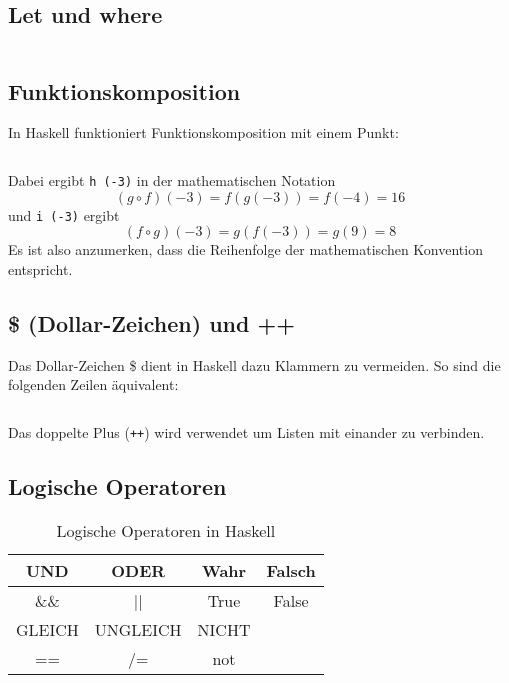 \subsection{Let und where}%
\inputminted[numbersep=5pt, tabsize=4]{haskell}{scripts/haskell/let-where-bindung.hs}

\subsection{Funktionskomposition}%
In Haskell funktioniert Funktionskomposition mit einem Punkt:

\inputminted[numbersep=5pt, tabsize=4]{haskell}{scripts/haskell/function-composition.hs}

Dabei ergibt \texttt{h (-3)} in der mathematischen Notation
\[(g \circ f) (-3) = f(g(-3)) = f(-4) = 16\]
und \texttt{i (-3)} ergibt
\[(f \circ g) (-3) = g(f(-3)) = g(9) = 8\]
Es ist also anzumerken, dass die Reihenfolge der mathematischen Konvention entspricht.

\subsection{\$ (Dollar-Zeichen) und ++}%
Das Dollar-Zeichen \$ dient in Haskell dazu Klammern zu vermeiden. So sind die
folgenden Zeilen äquivalent:

\inputminted[numbersep=5pt, tabsize=4]{haskell}{scripts/haskell/dollar-example.hs}

Das doppelte Plus (\texttt{++}) wird verwendet um Listen mit einander zu verbinden.

\subsection{Logische Operatoren}

\begin{table}[H]
    \centering 
    \begin{tabular}{CCCC}
    UND    & ODER     & Wahr  & Falsch \\ \hline\hline
    \&\&   & ||       & True  & False \\[4ex]
    GLEICH & UNGLEICH & NICHT & ~     \\ \hline\hline
    ==     & /=       & not   & ~     \\ 
    \end{tabular}
    \caption{Logische Operatoren in Haskell}
\end{table}

